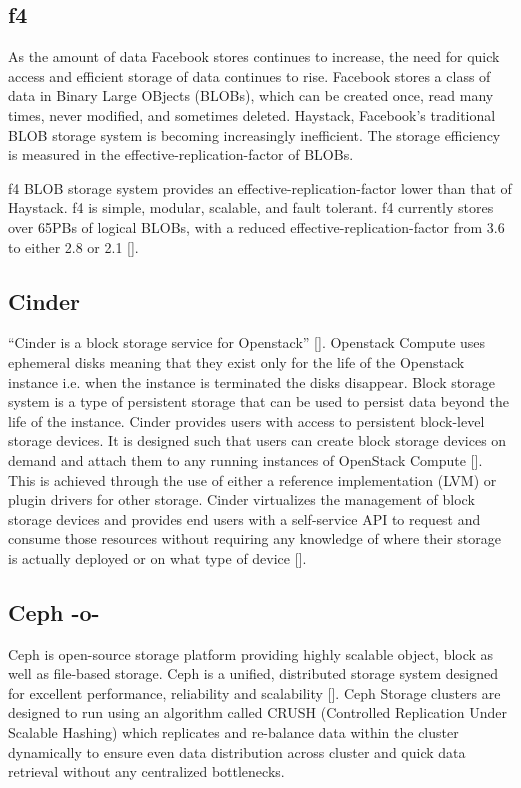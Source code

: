 \subsection{f4}
     
As the amount of data Facebook stores continues to increase, the need
for quick access and efficient storage of data continues to rise.
Facebook stores a class of data in Binary Large OBjects (BLOBs), which
can be created once, read many times, never modified, and sometimes
deleted. Haystack, Facebook's traditional BLOB storage system is
becoming increasingly inefficient. The storage efficiency is measured
in the effective-replication-factor of BLOBs.

f4 BLOB storage system provides an effective-replication-factor lower
than that of Haystack. f4 is simple, modular, scalable, and fault
tolerant. f4 currently stores over 65PBs of logical BLOBs, with a
reduced effective-replication-factor from 3.6 to either 2.8 or 2.1
[\cite{paper-f4}].

     
\subsection{Cinder}
      
``Cinder is a block storage service for
Openstack'' [\cite{wiki-Cinder}]. Openstack Compute uses ephemeral disks
meaning that they exist only for the life of the Openstack instance
i.e. when the instance is terminated the disks disappear. Block
storage system is a type of persistent storage that can be used to
persist data beyond the life of the instance. Cinder provides users
with access to persistent block-level storage devices. It is designed
such that users can create block storage devices on demand and attach
them to any running instances of OpenStack
Compute [\cite{book-Cinder}]. This is achieved through the use of either
a reference implementation (LVM) or plugin drivers for other
storage. Cinder virtualizes the management of block storage devices
and provides end users with a self-service API to request and consume
those resources without requiring any knowledge of where their storage
is actually deployed or on what type of device [\cite{wiki-Cinder}].
     
\subsection{Ceph -o-}

Ceph is open-source storage platform providing highly scalable object,
block as well as file-based storage. Ceph is a unified, distributed
storage system designed for excellent performance, reliability and
scalability [\cite{www-ceph}]. Ceph Storage clusters are designed to run
using an algorithm called CRUSH (Controlled Replication Under Scalable
Hashing) which replicates and re-balance data within the cluster
dynamically to ensure even data distribution across cluster and quick
data retrieval without any centralized bottlenecks.
 
